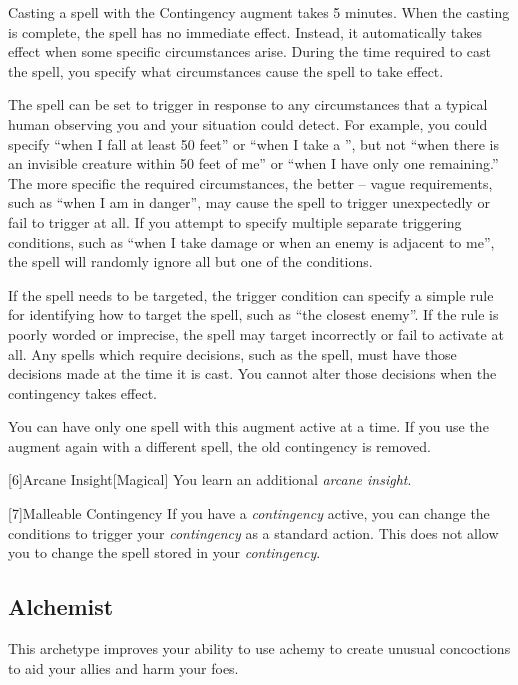         Casting a spell with the Contingency augment takes 5 minutes.
        When the casting is complete, the spell has no immediate effect.
        Instead, it automatically takes effect when some specific circumstances arise.
        During the time required to cast the spell, you specify what circumstances cause the spell to take effect.

        The spell can be set to trigger in response to any circumstances that a typical human observing you and your situation could detect.
        For example, you could specify ``when I fall at least 50 feet'' or ``when I take a '', but not ``when there is an invisible creature within 50 feet of me'' or ``when I have only one  remaining.''
        The more specific the required circumstances, the better -- vague requirements, such as ``when I am in danger'', may cause the spell to trigger unexpectedly or fail to trigger at all.
        If you attempt to specify multiple separate triggering conditions, such as ``when I take damage or when an enemy is adjacent to me'', the spell will randomly ignore all but one of the conditions.

        If the spell needs to be targeted, the trigger condition can specify a simple rule for identifying how to target the spell, such as ``the closest enemy''.
        If the rule is poorly worded or imprecise, the spell may target incorrectly or fail to activate at all.
        Any spells which require decisions, such as the  spell, must have those decisions made at the time it is cast.
        You cannot alter those decisions when the contingency takes effect.

        You can have only one spell with this augment active at a time.
        If you use the augment again with a different spell, the old contingency is removed.

        [6]{Arcane Insight}[Magical]
        You learn an additional \textit{arcane insight}.

        [7]{Malleable Contingency} If you have a \textit{contingency} active, you can change the conditions to trigger your \textit{contingency} as a standard action.
        This does not allow you to change the spell stored in your \textit{contingency}.

    \subsection{Alchemist}
        This archetype improves your ability to use achemy to create unusual concoctions to aid your allies and harm your foes.

